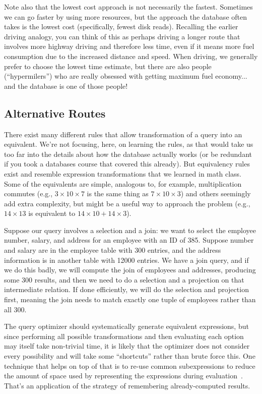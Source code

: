 Note also that the lowest cost approach is not necessarily the fastest. Sometimes we can go faster by using more resources, but the approach the database often takes is the lowest cost (specifically, fewest disk reads). Recalling the earlier driving analogy, you can think of this as perhaps driving a longer route that involves more highway driving and therefore less time, even if it means more fuel consumption due to the increased distance and speed. When driving, we generally prefer to choose the lowest time estimate, but there are also people (``hypermilers'') who are really obsessed with getting maximum fuel economy... and the database is one of those people!

\subsection*{Alternative Routes}
There exist many different rules that allow transformation of a query into an equivalent. We're not focusing, here, on learning the rules, as that would take us too far into the details about how the database actually works (or be redundant if you took a databases course that covered this already). But equivalency rules exist and resemble expression transformations that we learned in math class. Some of the equivalents are simple, analogous to, for example, multiplication commutes (e.g., $3 \times 10 \times 7$ is the same thing as $7 
\times 10 \times 3$) and others seemingly add extra complexity, but might be a useful way to approach the problem (e.g., $14 \times 13$ is equivalent to $14 \times 10 + 14 \times 3$). 

Suppose our query involves a selection and a join: we want to select the employee number, salary, and address for an employee with an ID of 385. Suppose number and salary are in the employee table with 300 entries, and the address information is in another table with 12000 entries. We have a join query, and if we do this badly, we will compute the join of employees and addresses, producing some 300 results, and then we need to do a selection and a projection on that intermediate relation. If done efficiently, we will do the selection and projection first, meaning the join needs to match exactly one tuple of employees rather than all 300. 

The query optimizer should systematically generate equivalent expressions, but since performing all possible transformations and then evaluating each option may itself take non-trivial time, it is likely that the optimizer does not consider every possibility and will take some ``shortcuts'' rather than brute force this. One technique that helps on top of that is to re-use common subexpressions to reduce the amount of space used by representing the expressions during evaluation~\cite{dsc}. That's an application of the strategy of remembering already-computed results.

